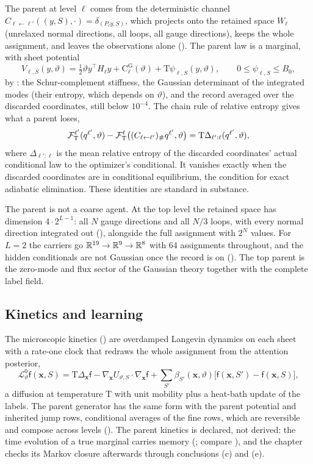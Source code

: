 The parent at level \(\ell\) comes from the deterministic channel
\(C_{\ell\leftarrow\ell'}((y,S),\cdot)=\delta_{(P_\ell y,S)}\), which projects onto the retained space
\(W_\ell\) (unrelaxed normal directions, all loops, all gauge directions), keeps the whole assignment, and
leaves the observations alone (). The parent law is a marginal, with sheet
potential
\[
V_{\ell,S}(y,\vartheta)=\tfrac12\vartheta y^\top H_\ell y+\mathrm C_\ell^{\mathrm G}(\vartheta)+\mathrm T\psi_{\ell,S}(y,\vartheta),
\qquad 0\le\psi_{\ell,S}\le B_0,
\]
by : the Schur-complement stiffness, the Gaussian determinant of
the integrated modes (their entropy, which depends on \(\vartheta\)), and the record averaged over the
discarded coordinates, still below \(10^{-4}\). The chain rule of relative entropy gives what a parent
loses,
\[
\mathcal F^{\ell'}_{\mathrm T}(q^{\ell'},\vartheta)-\mathcal F^{\ell}_{\mathrm T}\bigl((C_{\ell\leftarrow\ell'})_\#q^{\ell'},\vartheta\bigr)
=\mathrm T\Delta_{\ell':\ell}(q^{\ell'},\vartheta),
\]
where \(\Delta_{\ell':\ell}\) is the mean relative entropy of the discarded coordinates' actual conditional
law to the optimizer's conditional. It vanishes exactly when the discarded coordinates are in conditional
equilibrium, the condition for exact adiabatic elimination. These identities are standard in substance.

The parent is not a coarse agent. At the top level the retained space has dimension \(4\cdot2^{L-1}\): all
\(N\) gauge directions and all \(N/3\) loops, with every normal direction integrated out
(), alongside the full assignment with \(2^N\) values. For \(L=2\) the
carriers go \(\mathbb R^{19}\to\mathbb R^9\to\mathbb R^8\) with 64 assignments throughout, and the hidden conditionals are not
Gaussian once the record is on (). The top parent is the zero-mode and
flux sector of the Gaussian theory together with the complete label field.

\subsection{Kinetics and learning}
\label{comp:ch13-kinetics}

The microscopic kinetics () are overdamped Langevin dynamics on each sheet
with a rate-one clock that redraws the whole assignment from the attention posterior,
\[
\mathscr L_\vartheta^0\mathsf f(\mathbf x,S)=\mathrm T\Delta_{\mathbf x}\mathsf f-\nabla_{\mathbf x}U_{\vartheta,S}\cdot\nabla_{\mathbf x}\mathsf f
+\sum_{S'}\beta_{S'}(\mathbf x,\vartheta)\bigl[\mathsf f(\mathbf x,S')-\mathsf f(\mathbf x,S)\bigr],
\]
a diffusion at temperature \(\mathrm T\) with unit mobility plus a heat-bath update of the labels. The parent
generator has the same form with the parent potential and inherited jump rows, conditional averages of
the fine rows, which are reversible and compose across levels ().
The parent kinetics is declared, not derived: the time evolution of a true marginal carries memory
(; compare \citet{Zwanzig1960}), and the chapter checks its Markov closure
afterwards through conclusions (c) and (e).

